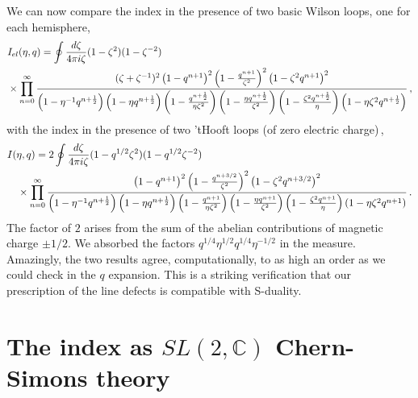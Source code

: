 \documentclass[11pt,letterpaper]{article}
\numberwithin{equation}{section}
\newcommand{\C}{{\mathbb C}}
\begin{document}
We can now compare the index in the presence of two basic Wilson loops, one for each hemisphere,
 \begin{align}
&I_{el}(\eta,q) = \oint \frac{d\zeta}{4\pi i\zeta} (1-\zeta^2)(1-\zeta^{-2}) \\\notag &\times\prod_{n=0}^{\infty} \frac{(\zeta + \zeta^{-1})^2 \left(1-q^{n+1}\right)^2 \left(1-\frac{q^{n+1}}{\zeta^2}\right)^2 \left(1-\zeta^2 q^{n+1}\right)^2}{\left(1-\eta^{-1}q^{n+\frac{1}{2}}\right) \left(1-\eta q^{n+\frac{1}{2}}\right)
   \left(1-\frac{q^{n+\frac{1}{2}}}{\eta \zeta^2}\right) \left(1-\frac{\eta q^{n+\frac{1}{2}}}{\zeta^2}\right) \left(1-\frac{\zeta^2 q^{n+\frac{1}{2}}}{\eta}\right) \left(1-\eta \zeta^2 q^{n+\frac{1}{2}}\right)}\,,
\end{align}
with the index in the presence of two 'tHooft loops (of zero electric charge)\,,
\begin{align}
&I(\eta,q) =2 \oint \frac{d\zeta}{4\pi i\zeta} (1-q^{1/2} \zeta^2)(1-q^{1/2} \zeta^{-2}) \\\notag &\quad\times \prod_{n=0}^{\infty} \frac{\left(1-q^{n+1}\right)^2 \left(1-\frac{q^{n+3/2}}{\zeta^2}\right)^2 \left(1-\zeta^2 q^{n+3/2}\right)^2}{\left(1-\eta^{-1}q^{n+\frac{1}{2}}\right) \left(1-\eta q^{n+\frac{1}{2}}\right)
   \left(1-\frac{q^{n+1}}{\eta \zeta^2}\right) \left(1-\frac{\eta q^{n+1}}{\zeta^2}\right) \left(1-\frac{\zeta^2 q^{n+1}}{\eta}\right) \left(1-\eta \zeta^2 q^{n+1}\right)}\,.
\end{align}
The factor of $2$ arises from the sum of the abelian contributions of magnetic charge $\pm 1/2$. We absorbed the factors $q^{1/4} \eta^{1/2}q^{1/4} \eta^{-1/2}$ in the measure.
Amazingly, the two results agree, computationally, to as high an order as we could check in the $q$ expansion.
This is a striking verification that our prescription of the line defects is compatible with S-duality.




\section{The index as $SL(2,\C)$ Chern-Simons theory}
\label{sec:CS}
\end{document}
